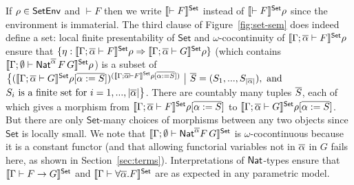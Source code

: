 \documentclass[runningheads]{llncs}
\newcommand{\set}{\mathsf{Set}}
\begin{document}
%
If $\rho \in \mathsf{SetEnv}$ and $\vdash F$ then we write $\setsem{\vdash F}$
instead of $\setsem{\vdash F}\rho$ since the environment is
immaterial. The third clause of Figure~\ref{fig:set-sem} does indeed
define a set: local finite presentability of $\set$ and
$\omega$-cocontinuity of $\setsem{\Gamma;\ol{\alpha} \vdash F}\rho$
ensure that $\{\eta : \setsem{\Gamma;\ol{\alpha} \vdash F}\rho
\Rightarrow \setsem{\Gamma;\ol{\alpha} \vdash G}\rho\}$ (which
contains $\setsem{\Gamma;\emptyset \vdash
  \Nat^{\ol{\alpha}}\,F\,G}\rho$) is a subset of
$\big\{({\setsem{\Gamma;\ol{\alpha} \vdash G}\rho[\ol{\alpha :=
      S}]})^{(\setsem{\Gamma;\ol{\alpha} \vdash F}\rho[\ol{\alpha :=
      S}])}~\big|~ \ol{S} = (S_1,...,S_{|\ol{\alpha}|}), \mbox{ and }$
$S_i \mbox{ is a finite set for } i =
1,...,|\overline{\alpha}|\big\}$. There are countably many tuples
$\overline{S}$, each of which gives a morphism from
${\setsem{\Gamma;\ol{\alpha} \vdash F}\rho[ \ol{\alpha := S}]}$ to
${\setsem{\Gamma;\ol{\alpha} \vdash G}\rho[\ol{\alpha := S}]}$. But
there are only $\set$-many choices of morphisms between any two
objects since $\set$ is locally small.  We note that $\setsem{\Gamma;
  \emptyset \vdash \Nat^{\ol\alpha} F\,G}$ is $\omega$-cocontinuous
because it is a constant functor (and that allowing functorial
variables not in $\overline{\alpha}$ in $G$ fails here, as shown in
Section~\ref{sec:terms}).
Interpretations of $\mathsf{Nat}$-types ensure
that $\setsem{\Gamma \vdash F \to G}$ and $\setsem{\Gamma \vdash
  \forall \ol\alpha. F}$ are as expected in any parametric model.
\end{document}
